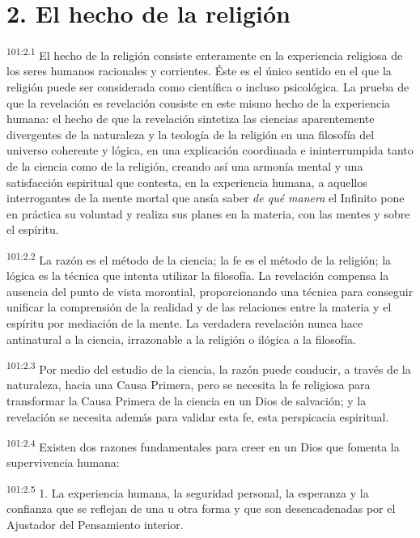 \documentclass[twoside, 11pt]{book}
\begin{document}
\section*{2. El hecho de la religión}
\par
\textsuperscript{101:2.1} El hecho de la religión consiste enteramente en la experiencia religiosa de los seres humanos racionales y corrientes. Éste es el único sentido en el que la religión puede ser considerada como científica o incluso psicológica. La prueba de que la revelación es revelación consiste en este mismo hecho de la experiencia humana: el hecho de que la revelación sintetiza las ciencias aparentemente divergentes de la naturaleza y la teología de la religión en una filosofía del universo coherente y lógica, en una explicación coordinada e ininterrumpida tanto de la ciencia como de la religión, creando así una armonía mental y una satisfacción espiritual que contesta, en la experiencia humana, a aquellos interrogantes de la mente mortal que ansía saber \textit{de qué manera} el Infinito pone en práctica su voluntad y realiza sus planes en la materia, con las mentes y sobre el espíritu.

\par
\textsuperscript{101:2.2} La razón es el método de la ciencia; la fe es el método de la religión; la lógica es la técnica que intenta utilizar la filosofía. La revelación compensa la ausencia del punto de vista morontial, proporcionando una técnica para conseguir unificar la comprensión de la realidad y de las relaciones entre la materia y el espíritu por mediación de la mente. La verdadera revelación nunca hace antinatural a la ciencia, irrazonable a la religión o ilógica a la filosofía.

\par
\textsuperscript{101:2.3} Por medio del estudio de la ciencia, la razón puede conducir, a través de la naturaleza, hacia una Causa Primera, pero se necesita la fe religiosa para transformar la Causa Primera de la ciencia en un Dios de salvación; y la revelación se necesita además para validar esta fe, esta perspicacia espiritual.

\par
\textsuperscript{101:2.4} Existen dos razones fundamentales para creer en un Dios que fomenta la supervivencia humana:

\par
\textsuperscript{101:2.5} 1. La experiencia humana, la seguridad personal, la esperanza y la confianza que se reflejan de una u otra forma y que son desencadenadas por el Ajustador del Pensamiento interior.
\end{document}
